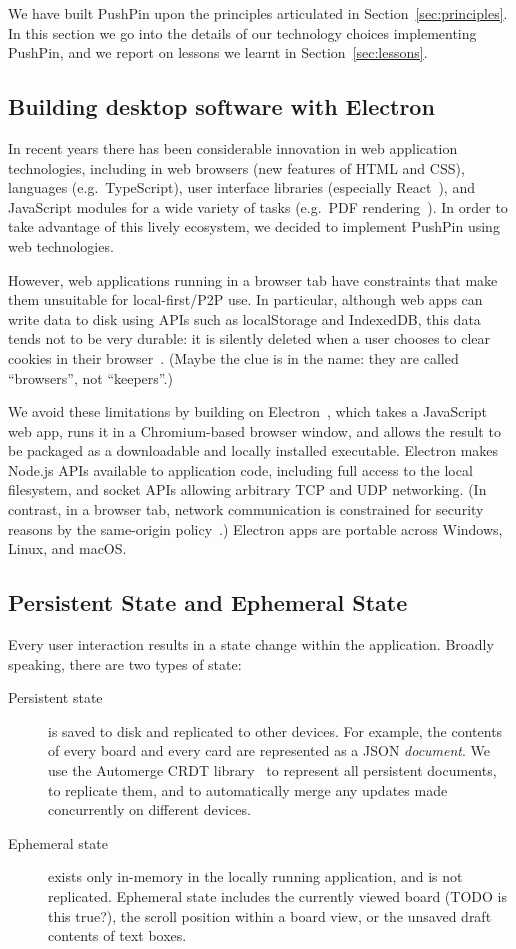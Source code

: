 \documentclass[sigplan,10pt]{acmart}
\begin{document}
We have built PushPin upon the principles articulated in Section~\ref{sec:principles}.
In this section we go into the details of our technology choices implementing PushPin, and we report on lessons we learnt in Section~\ref{sec:lessons}.

\subsection{Building desktop software with Electron}

In recent years there has been considerable innovation in web application technologies, including in web browsers (new features of HTML and CSS), languages (e.g.\ TypeScript), user interface libraries (especially React~\cite{React}), and JavaScript modules for a wide variety of tasks (e.g.\ PDF rendering~\cite{PDFjs}).
In order to take advantage of this lively ecosystem, we decided to implement PushPin using web technologies.

However, web applications running in a browser tab have constraints that make them unsuitable for local-first/P2P use.
In particular, although web apps can write data to disk using APIs such as localStorage and IndexedDB, this data tends not to be very durable: it is silently deleted when a user chooses to clear cookies in their browser~\cite{LocalStorageCleared}.
(Maybe the clue is in the name: they are called ``browsers'', not ``keepers''.)

We avoid these limitations by building on Electron~\cite{Electron}, which takes a JavaScript web app, runs it in a Chromium-based browser window, and allows the result to be packaged as a downloadable and locally installed executable.
Electron makes Node.js APIs available to application code, including full access to the local filesystem, and socket APIs allowing arbitrary TCP and UDP networking.
(In contrast, in a browser tab, network communication is constrained for security reasons by the same-origin policy~\cite{SameOrigin}.)
Electron apps are portable across Windows, Linux, and macOS.

\subsection{Persistent State and Ephemeral State}

Every user interaction results in a state change within the application.
Broadly speaking, there are two types of state:
\begin{description}
\item[Persistent state] is saved to disk and replicated to other devices.
For example, the contents of every board and every card are represented as a JSON \emph{document}.
We use the Automerge CRDT library~\cite{Automerge,Automerge:2018} to represent all persistent documents, to replicate them, and to automatically merge any updates made concurrently on different devices.
\item[Ephemeral state] exists only in-memory in the locally running application, and is not replicated.
Ephemeral state includes the currently viewed board (TODO is this true?), the scroll position within a board view, or the unsaved draft contents of text boxes.
\end{description}
\end{document}
